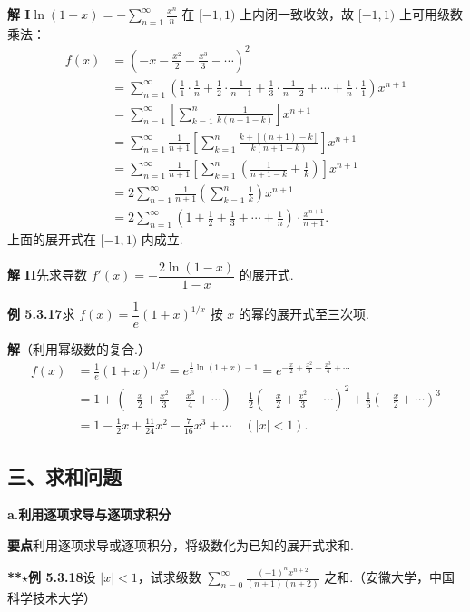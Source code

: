 \documentclass[UTF8,12pt,a4paper,fontset=fandol]{ctexart}
\begin{document}
\noindent\textbf{解 I}\quad $\displaystyle\ln(1-x)=-\sum_{n=1}^{\infty}\frac{x^n}{n}$ 在 $[-1,1)$ 上内闭一致收敛，故 $[-1,1)$ 上可用级数乘法：
\[
\begin{aligned}
f(x)
&=\left(-x-\frac{x^2}{2}-\frac{x^3}{3}-\cdots\right)^2\\
&=\sum_{n=1}^{\infty}\left(\frac11\cdot\frac1n+\frac12\cdot\frac1{n-1}
+\frac13\cdot\frac1{n-2}+\cdots+\frac1n\cdot\frac11\right)x^{n+1}\\
&=\sum_{n=1}^{\infty}\left[\sum_{k=1}^n\frac1{k(n+1-k)}\right]x^{n+1}\\
&=\sum_{n=1}^{\infty}\frac1{n+1}\left[\sum_{k=1}^n
\frac{k+[(n+1)-k]}{k(n+1-k)}\right]x^{n+1}\\
&=\sum_{n=1}^{\infty}\frac1{n+1}\left[\sum_{k=1}^n
\left(\frac1{n+1-k}+\frac1k\right)\right]x^{n+1}\\
&=2\sum_{n=1}^{\infty}\frac1{n+1}\left(\sum_{k=1}^n\frac1k\right)x^{n+1}\\
&=2\sum_{n=1}^{\infty}\left(1+\frac12+\frac13+\cdots+\frac1n\right)\cdot\frac{x^{n+1}}{n+1}.
\end{aligned}
\]
上面的展开式在 $[-1,1)$ 内成立.

\noindent\textbf{解 II}\quad 先求导数
$f'(x)=-\dfrac{2\ln(1-x)}{1-x}$ 的展开式.

\noindent\textbf{例 5.3.17}\quad 求 $f(x)=\dfrac1e(1+x)^{1/x}$ 按 $x$ 的幂的展开式至三次项.

\noindent\textbf{解}\quad （利用幂级数的复合.）
\[
\begin{aligned}
f(x)
&=\frac1e(1+x)^{1/x}
=e^{\frac1x\ln(1+x)-1}
=e^{-\frac x2+\frac{x^2}3-\frac{x^3}4+\cdots}\\
&=1+\left(-\frac x2+\frac{x^2}3-\frac{x^3}4+\cdots\right)
+\frac12\left(-\frac x2+\frac{x^2}3-\cdots\right)^2
+\frac16\left(-\frac x2+\cdots\right)^3\\
&=1-\frac12x+\frac{11}{24}x^2-\frac7{16}x^3+\cdots\quad(|x|<1).
\end{aligned}
\]

\subsection*{三、求和问题}

\noindent\textbf{a.\quad 利用逐项求导与逐项求积分}

\noindent\textbf{要点}\quad 利用逐项求导或逐项积分，将级数化为已知的展开式求和.

\noindent\textbf{**}\(\star\)\textbf{例 5.3.18}\quad 设 $|x|<1$，试求级数
$\displaystyle\sum_{n=0}^{\infty}\frac{(-1)^nx^{n+2}}{(n+1)(n+2)}$ 之和.（安徽大学，中国科学技术大学）
\end{document}
